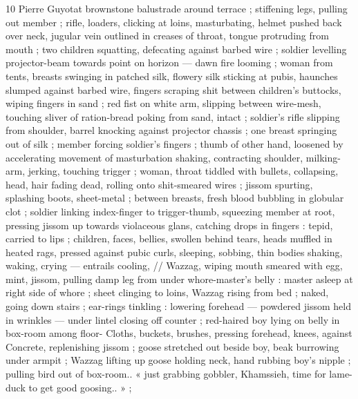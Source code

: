 10 Pierre Guyotat
brownstone balustrade around terrace ; stiffening legs, pulling out
member ; rifle, loaders, clicking at loins, masturbating, helmet
pushed back over neck, jugular vein outlined in creases of throat,
tongue protruding from mouth ; two children squatting, defecating
against barbed wire ; soldier levelling projector-beam towards point
on horizon — dawn fire looming ; woman from tents, breasts
swinging in patched silk, flowery silk sticking at pubis, haunches
slumped against barbed wire, fingers scraping shit between
children's buttocks, wiping fingers in sand ; red fist on white arm,
slipping between wire-mesh, touching sliver of ration-bread poking
from sand, intact ; soldier's rifle slipping from shoulder, barrel
knocking against projector chassis ; one breast springing out of silk
; member forcing soldier's fingers ; thumb of other hand, loosened
by accelerating movement of masturbation shaking, contracting
shoulder, milking-arm, jerking, touching trigger ; woman, throat
tiddled with bullets, collapsing, head, hair fading dead, rolling onto
shit-smeared wires ; jissom spurting, splashing boots, sheet-metal ;
between breasts, fresh blood bubbling in globular clot ; soldier
linking index-finger to trigger-thumb, squeezing member at root,
pressing jissom up towards violaceous glans, catching drops in
fingers : tepid, carried to lips ; children, faces, bellies, swollen
behind tears, heads muffled in heated rags, pressed against pubic
curls, sleeping, sobbing, thin bodies shaking, waking, crying —
entrails cooling, // Wazzag, wiping mouth smeared with egg, mint,
jissom, pulling damp leg from under whore-master's belly : master
asleep at right side of whore ; sheet clinging to loins, Wazzag rising
from bed ; naked, going down stairs ; ear-rings tinkling : lowering
forehead — powdered jissom held in wrinkles — under lintel closing
off counter ; red-haired boy lying on belly in box-room among floor-
Cloths, buckets, brushes, pressing forehead, knees, against
Concrete, replenishing jissom ; goose stretched out beside boy, beak
burrowing under armpit ; Wazzag lifting up goose holding neck, hand
rubbing boy's nipple ; pulling bird out of box-room.. « just grabbing
gobbler, Khamssieh, time for lame-duck to get good goosing.. » ;

